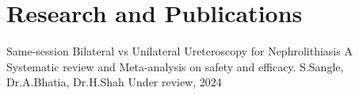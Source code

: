 \vspace{-4mm}
\section{Research and Publications}
\resumeSubHeadingListStart

\resumePublication
{Same-session Bilateral vs Unilateral Ureteroscopy for Nephrolithiasis}
{A Systematic review and Meta-analysis on safety and efficacy.}
{S.Sangle, Dr.A.Bhatia, Dr.H.Shah}
{Under review, 2024}

\resumeSubHeadingListEnd